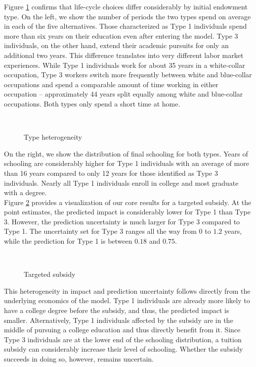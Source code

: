 \noindent Figure \ref{Type heterogeneity} confirms that life-cycle choices differ considerably by initial endowment type. On the left, we show the number of periods the two types spend on average in each of the five alternatives. Those characterized as Type 1 individuals spend more than six years on their education even after entering the model. Type 3 individuals, on the other hand, extend their academic pursuits for only an additional two years. This difference translates into very different labor market experiences. While Type 1 individuals work for about 35 years in a white-collar occupation, Type 3 workers switch more frequently between white and blue-collar occupations and spend a comparable amount of time working in either occupation -- approximately 44 years split equally among white and blue-collar occupations. Both types only spend a short time at home.
%
\begin{figure}[h!]\centering
{}
\\
\caption{Type heterogeneity}\label{Type heterogeneity}
\end{figure}\FloatBarrier
%
\noindent On the right, we show the distribution of final schooling for both types. Years of schooling are considerably higher for Type 1 individuals with an average of more than 16 years compared to only 12 years for those identified as Type 3 individuals. Nearly all Type 1 individuals enroll in college and most graduate with a degree.\\

\noindent Figure \ref{Targeted subsidy} provides a visualization of our core results for a targeted subsidy. At the point estimates, the predicted impact is considerably lower for Type 1 than Type 3. However, the prediction uncertainty is much larger for Type 3 compared to Type 1. The uncertainty set for Type 3 ranges all the way from $0$ to $1.2$ years, while the prediction for Type 1 is between $0.18$ and $0.75$.\\
%
\begin{figure}[h!]\centering
{}
\\
\caption{Targeted subsidy}\label{Targeted subsidy}
\end{figure}\FloatBarrier
%
\noindent This heterogeneity in impact and prediction uncertainty follows directly from the underlying economics of the model. Type 1 individuals are already more likely to have a college degree before the subsidy, and thus, the predicted impact is smaller. Alternatively, Type 1 individuals affected by the subsidy are in the middle of pursuing a college education and thus directly benefit from it. Since Type 3 individuals are at the lower end of the schooling distribution, a tuition subsidy can considerably increase their level of schooling. Whether the subsidy succeeds in doing so, however, remains uncertain.\\

